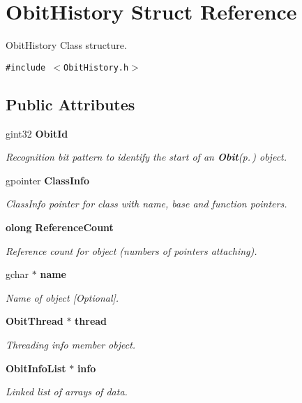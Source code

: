 \section{Obit\-History Struct Reference}
\label{structObitHistory}
Obit\-History Class structure.  


{\tt \#include $<$Obit\-History.h$>$}

\subsection*{Public Attributes}
\begin{CompactItemize}
\item 
gint32 {\bf Obit\-Id}
\begin{CompactList}\small\item\em Recognition bit pattern to identify the start of an {\bf Obit}{\rm (p.\,\pageref{structObit})} object. \item\end{CompactList}\item 
gpointer {\bf Class\-Info}
\begin{CompactList}\small\item\em Class\-Info pointer for class with name, base and function pointers. \item\end{CompactList}\item 
{\bf olong} {\bf Reference\-Count}
\begin{CompactList}\small\item\em Reference count for object (numbers of pointers attaching). \item\end{CompactList}\item 
gchar $\ast$ {\bf name}
\begin{CompactList}\small\item\em Name of object [Optional]. \item\end{CompactList}\item 
{\bf Obit\-Thread} $\ast$ {\bf thread}
\begin{CompactList}\small\item\em Threading info member object. \item\end{CompactList}\item 
{\bf Obit\-Info\-List} $\ast$ {\bf info}
\begin{CompactList}\small\item\em Linked list of arrays of data. \item\end{CompactList}\item 

\end{CompactItemize}
